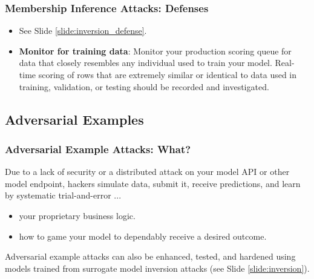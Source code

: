 \documentclass[11pt,
               aspectratio=169,
               hyperref={colorlinks}
               ]{beamer}
\begin{document}
			\begin{frame}
		
				\frametitle{Membership Inference Attacks: \textbf{Defenses}}		
			
				\begin{itemize}
					\item See Slide \ref{slide:inversion_defense}.
				\item \textbf{Monitor for training data}: Monitor your production scoring queue for data that closely resembles any individual used to train your model. Real-time scoring of rows that are extremely similar or identical to data used in training, validation, or testing should be recorded and investigated.
				\end{itemize}

			\end{frame}
	
		\subsection{Adversarial Examples}
	
			\begin{frame}
		
				\frametitle{Adversarial Example Attacks: \textbf{What?}}		

Due to a lack of security or a distributed attack on your model API or other model endpoint, hackers simulate data, submit it, receive predictions, and learn by systematic trial-and-error ... 		
				\begin{itemize}
					\item your proprietary business logic.
					\item how to game your model to dependably receive a desired outcome. 
				\end{itemize}
				\vspace{10pt}
Adversarial example attacks can also be enhanced, tested, and hardened using models trained from surrogate model inversion attacks (see Slide \ref{slide:inversion}).

			\end{frame}	
	
\end{document}
